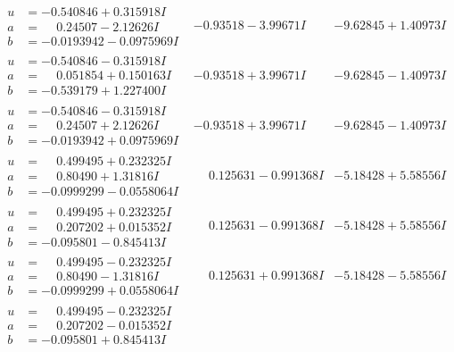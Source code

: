 \documentclass[1p]{elsarticle_modified}
\theoremstyle{definition}
\begin{document}
$$\begin{array}{c|c|c}
\begin{aligned}
u &= -0.540846 + 0.315918 I \\
a &= \phantom{-}0.24507 - 2.12626 I \\
b &= -0.0193942 - 0.0975969 I\end{aligned}
 & -0.93518 - 3.99671 I & -9.62845 + 1.40973 I \\ \hline\begin{aligned}
u &= -0.540846 - 0.315918 I \\
a &= \phantom{-}0.051854 + 0.150163 I \\
b &= -0.539179 + 1.227400 I\end{aligned}
 & -0.93518 + 3.99671 I & -9.62845 - 1.40973 I \\ \hline\begin{aligned}
u &= -0.540846 - 0.315918 I \\
a &= \phantom{-}0.24507 + 2.12626 I \\
b &= -0.0193942 + 0.0975969 I\end{aligned}
 & -0.93518 + 3.99671 I & -9.62845 - 1.40973 I \\ \hline\begin{aligned}
u &= \phantom{-}0.499495 + 0.232325 I \\
a &= \phantom{-}0.80490 + 1.31816 I \\
b &= -0.0999299 - 0.0558064 I\end{aligned}
 & \phantom{-}0.125631 - 0.991368 I & -5.18428 + 5.58556 I \\ \hline\begin{aligned}
u &= \phantom{-}0.499495 + 0.232325 I \\
a &= \phantom{-}0.207202 + 0.015352 I \\
b &= -0.095801 - 0.845413 I\end{aligned}
 & \phantom{-}0.125631 - 0.991368 I & -5.18428 + 5.58556 I \\ \hline\begin{aligned}
u &= \phantom{-}0.499495 - 0.232325 I \\
a &= \phantom{-}0.80490 - 1.31816 I \\
b &= -0.0999299 + 0.0558064 I\end{aligned}
 & \phantom{-}0.125631 + 0.991368 I & -5.18428 - 5.58556 I \\ \hline\begin{aligned}
u &= \phantom{-}0.499495 - 0.232325 I \\
a &= \phantom{-}0.207202 - 0.015352 I \\
b &= -0.095801 + 0.845413 I\end{aligned}

\end{array}$$
\end{document}
